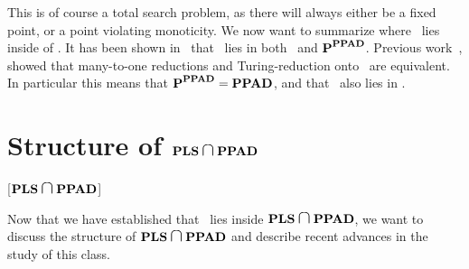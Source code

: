This is of course a total search problem, as there will always either be a fixed point, or a point violating monoticity.
We now want to summarize where \Tarski\ lies inside of \TFNP{}.
It has been shown in~\cite{etessami_tarskis_2020} that \Tarski\ lies in both \PLS\ and $\textbf{P}^{\textbf{PPAD}}$.
Previous work~, showed that many-to-one reductions and Turing-reduction onto \PPAD\ are equivalent.
In particular this means that $\textbf{P}^{\textbf{PPAD}} = \textbf{PPAD}$, and that \Tarski\ also lies in \PPAD{}.

\section{Structure of \texorpdfstring{$\PLS \medcap \PPAD$}{\PLS\ and \PPAD}}[\texorpdfstring{$\PLS \medcap \PPAD$}{\PLS\ and \PPAD}]

Now that we have established that \Tarski\ lies inside $\PLS \medcap \PPAD$, we want to discuss the structure of $\PLS \medcap \PPAD$ and describe recent
advances in the study of this class.
